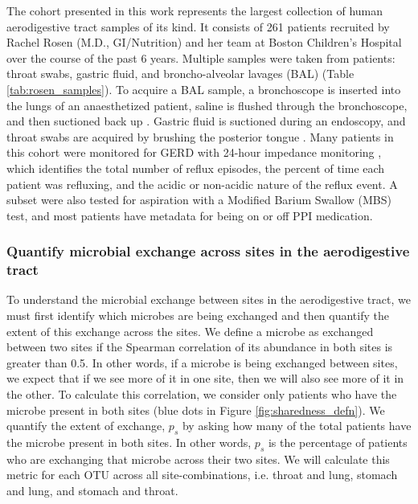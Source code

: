 \documentclass[12pt]{article}
\begin{document}
The cohort presented in this work represents the largest collection of 
human aerodigestive tract samples of its kind.
It consists of 261 patients recruited by Rachel Rosen 
(M.D., GI/Nutrition) and her team at Boston Children's Hospital  
over the course of the past 6 years. Multiple samples were 
taken from patients: throat swabs, gastric fluid, and broncho-alveolar lavages (BAL) (Table \ref{tab:rosen_samples}). 
To acquire a BAL sample, a bronchoscope is inserted into the lungs 
of an anaesthetized patient, saline is flushed through the 
bronchoscope, and then suctioned back up \cite{charslon-topographical-2011}. 
Gastric fluid is suctioned during an endoscopy, and throat
swabs are acquired by brushing the posterior tongue \cite{rosen-ppi-2015}. 
Many patients in this cohort were monitored for GERD with 24-hour
impedance monitoring \cite{vakil-gerd_defn-2006}, which identifies the total number of reflux episodes,
the percent of time each patient was refluxing, and the acidic or non-acidic
nature of the reflux event. A subset were also tested for aspiration with
a Modified Barium Swallow (MBS) test, and most patients have metadata for being on or off PPI medication.

\subsubsection{Quantify microbial exchange across sites in the aerodigestive tract} \label{sec:exchange}

To understand the microbial exchange between sites in the 
aerodigestive tract, we must first identify which microbes are being exchanged
and then quantify the extent of this exchange across the sites. 
We define a microbe as exchanged between two sites if the Spearman 
correlation of its abundance in both sites is greater than 0.5.
In other words, if a microbe is being exchanged between sites, we expect that if we see 
more of it in one site, then we will also see more of it in the other. 
To calculate this correlation, we consider only patients who have the microbe present in both sites (blue dots in Figure \ref{fig:sharedness_defn}).
We quantify the extent of exchange, $p_s$ by asking how many of the total patients
have the microbe present in both sites. In other words, $p_s$ is the 
percentage of patients who are exchanging that microbe across their two sites.
We will calculate this metric for each OTU across all site-combinations, 
i.e. throat and lung, stomach and lung, and stomach and throat.
\end{document}
